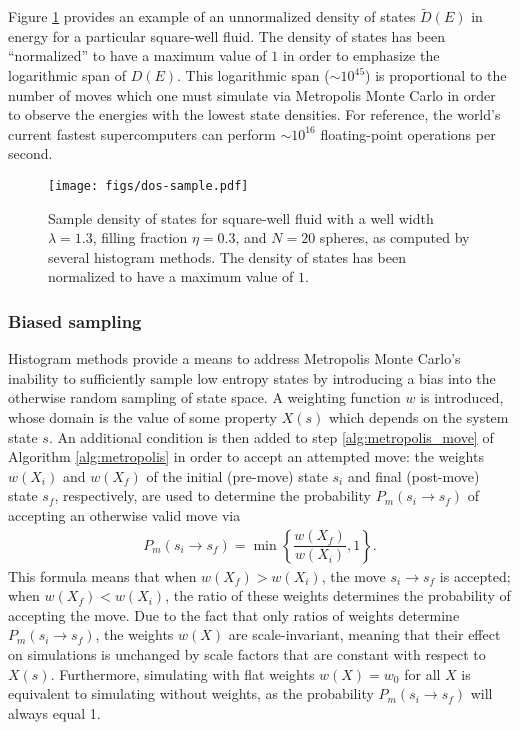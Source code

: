 \documentclass[11pt]{article}
\newcommand{\f}[2]{\dfrac{#1}{#2}} %
\newcommand{\p}[1]{\left(#1\right)} %
\renewcommand{\set}[1]{\left\{#1\right\}} %
\begin{document}
Figure \ref{fig:dos_sample} provides an example of an unnormalized
density of states $\tilde D\p{E}$ in energy for a particular
square-well fluid. The density of states has been ``normalized'' to
have a maximum value of $1$ in order to emphasize the logarithmic span
of $D\p{E}$. This logarithmic span ($\sim10^{45}$) is proportional to
the number of moves which one must simulate via Metropolis Monte Carlo
in order to observe the energies with the lowest state densities. For
reference, the world's current fastest supercomputers can perform
$\sim10^{16}$ floating-point operations per second.

\begin{figure}
  \centering
  \texttt{[image: figs/dos-sample.pdf]}
  \caption[Sample density of states]{Sample density of states for
    square-well fluid with a well width $\lambda=1.3$, filling
    fraction $\eta=0.3$, and $N=20$ spheres, as computed by several
    histogram methods. The density of states has been normalized to
    have a maximum value of $1$.}
  \label{fig:dos_sample}
\end{figure}

\subsubsection{Biased sampling}
\label{sec:biased_sampling}

Histogram methods provide a means to address Metropolis Monte Carlo's
inability to sufficiently sample low entropy states by introducing a
bias into the otherwise random sampling of state space. A weighting
function $w$ is introduced, whose domain is the value of some property
$X\p{s}$ which depends on the system state $s$. An additional
condition is then added to step \ref{alg:metropolis_move} of Algorithm
\ref{alg:metropolis} in order to accept an attempted move: the weights
$w\p{X_i}$ and $w\p{X_f}$ of the initial (pre-move) state $s_i$ and
final (post-move) state $s_f$, respectively, are used to determine the
probability $P_m\p{s_i\to s_f}$ of accepting an otherwise valid move
via
\begin{align}
  P_m\p{s_i\to s_f}=\min\set{\f{w\p{X_f}}{w\p{X_i}},1}.
  \label{eq:move_prob}
\end{align}
This formula means that when $w\p{X_f}>w\p{X_i}$, the move $s_i\to
s_f$ is accepted; when $w\p{X_f}<w\p{X_i}$, the ratio of these weights
determines the probability of accepting the move. Due to the fact that
only ratios of weights determine $P_m\p{s_i\to s_f}$, the weights
$w\p{X}$ are scale-invariant, meaning that their effect on simulations
is unchanged by scale factors that are constant with respect to
$X\p{s}$. Furthermore, simulating with flat weights $w\p{X}=w_0$ for
all $X$ is equivalent to simulating without weights, as the
probability $P_m\p{s_i\to s_f}$ will always equal 1.
\end{document}
